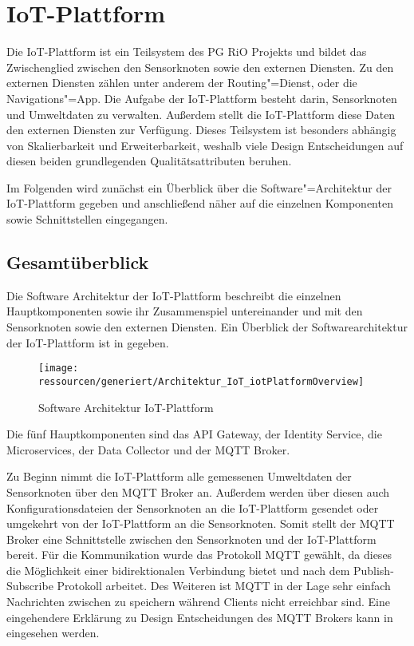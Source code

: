 \section{IoT-Plattform}
\label{sec:arch:iot}
Die IoT-Plattform ist ein Teilsystem des PG RiO Projekts und bildet das Zwischenglied zwischen den Sensorknoten sowie den externen Diensten.
Zu den externen Diensten zählen unter anderem der Routing"=Dienst, oder die Navigations"=App.
Die Aufgabe der IoT-Plattform besteht darin, Sensorknoten und Umweltdaten zu verwalten.
Außerdem stellt die IoT-Plattform diese Daten den externen Diensten zur Verfügung.
Dieses Teilsystem ist besonders abhängig von Skalierbarkeit und Erweiterbarkeit, weshalb viele Design Entscheidungen auf diesen beiden grundlegenden Qualitätsattributen beruhen.


Im Folgenden wird zunächst ein Überblick über die Software"=Architektur der IoT-Plattform gegeben und anschließend näher auf die einzelnen Komponenten sowie Schnittstellen eingegangen.

\subsection{Gesamtüberblick}
Die Software Architektur der IoT-Plattform beschreibt die einzelnen Hauptkomponenten sowie ihr Zusammenspiel untereinander und mit den Sensorknoten sowie den externen Diensten.
Ein Überblick der Softwarearchitektur der IoT-Plattform ist in  gegeben.
\begin{figure}[!htb]
	\centering
	\texttt{[image: ressourcen/generiert/Architektur\_IoT\_iotPlatformOverview]}
	\caption{Software Architektur IoT-Plattform}
	\label{fig:ArcitectureIoT}
\end{figure}
\newline 
Die fünf Hauptkomponenten sind das API Gateway, der Identity Service, die Microservices, der Data Collector und der MQTT Broker.


Zu Beginn nimmt die IoT-Plattform alle gemessenen Umweltdaten der Sensorknoten über den MQTT Broker an.
Außerdem werden über diesen auch Konfigurationsdateien der Sensorknoten an die IoT-Plattform gesendet oder umgekehrt von der IoT-Plattform an die Sensorknoten.
Somit stellt der MQTT Broker eine Schnittstelle zwischen den Sensorknoten und der IoT-Plattform bereit. \newline
Für die Kommunikation wurde das Protokoll MQTT gewählt, da dieses die Möglichkeit einer bidirektionalen Verbindung bietet und nach dem Publish-Subscribe Protokoll arbeitet.
Des Weiteren ist MQTT in der Lage sehr einfach Nachrichten zwischen zu speichern während Clients nicht erreichbar sind. 
Eine eingehendere Erklärung zu Design Entscheidungen des MQTT Brokers kann in  eingesehen werden. 


